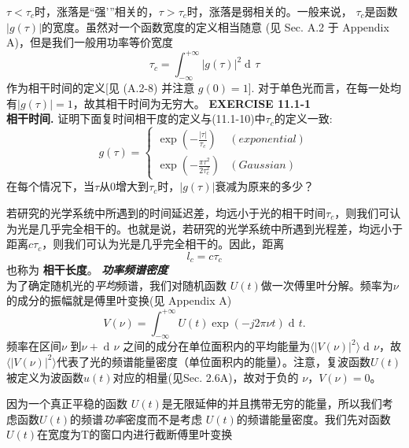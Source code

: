 \documentclass[UTF8]{ctexart}
\newcommand\crule[3][black]{\textcolor{#1}{\rule{#2}{#3}}}
\numberwithin{figure}{subsection}
\numberwithin{table}{subsection}
\DeclareMathOperator\dif{d\!}
\begin{document}
\par  $\tau < \tau_c $时，涨落是“强'”相关的，$ \tau > \tau_c $时，涨落是弱相关的。一般来说， $ \tau_c $是函数$\lvert g(\tau) \rvert $的宽度。虽然对一个函数宽度的定义相当随意 (见 Sec. A.2 于 Appendix A)，但是我们一般用功率等价宽度
\begin{equation}
\tau_c = \int_{-\infty}^{+\infty} \lvert g(\tau) \rvert ^2 \dif \tau
\end{equation}
作为相干时间的定义[见 (A.2-8) 并注意 $ g(0) = 1$]. 对于单色光而言，在每一处均有$\lvert g(\tau) \rvert = 1$，故其相干时间为无穷大。
\bigbreak\noindent{\crule[ksc]{\textwidth}{0.2cm}}
\textbf{EXERCISE 11.1-1} \\
\textbf{相干时间.} 证明下面复时间相干度的定义与(11.1-10)中$ \tau_c $的定义一致:
\begin{equation}
g(\tau) = 
\begin{cases}
\exp(-\frac{\lvert \tau \rvert}{\tau_c}) & (exponential) \\
\exp(-\frac{\pi \tau^2}{2\tau_c^2}) & (Gaussian)
\end{cases}
\end{equation}
在每个情况下，当$ \tau $从0增大到$ \tau_c $时，$ \lvert g(\tau) \rvert $衰减为原来的多少？\\
\noindent{\crule[ksc]{\textwidth}{0.2cm}}
\par 若研究的光学系统中所遇到的时间延迟差，均远小于光的相干时间$ \tau_c $，则我们可认为光是几乎完全相干的。也就是说，若研究的光学系统中所遇到光程差，均远小于距离$c\tau_c$，则我们可认为光是几乎完全相干的。因此，距离
\begin{equation}
l_c = c\tau_c
\end{equation}
也称为 \textbf{相干长度}。
\bigbreak\noindent\textcolor{ksc}{\textbf{\textsl{功率频谱密度}}}\\
为了确定随机光的\textsl{平均}频谱，我们对随机函数 $ U(t) $做一次傅里叶分解。频率为$ \nu $的成分的振幅就是傅里叶变换(见 Appendix A)
\begin{equation}
V(\nu) = \int_{-\infty}^{+\infty} U(t) \exp(-j2 \pi \nu t) \dif t .
\end{equation}
频率在区间$ \nu $ 到$ \nu +\dif \nu $ 之间的成分在单位面积内的平均能量为$ \langle \lvert V(\nu) \rvert ^2 \rangle \dif \nu $，故 $ \langle \lvert V(\nu) \rvert ^2 \rangle $代表了光的频谱能量密度（单位面积内的能量）。注意，复波函数$ U(t) $被定义为波函数$u(t)$对应的相量(见Sec. 2.6A)，故对于负的 $ \nu $，$ V(\nu) = 0 $。
\par 因为一个真正平稳的函数 $ U(t) $是无限延伸的并且携带无穷的能量，所以我们考虑函数$ U(t) $的频谱\textsl{功率}密度而不是考虑 $ U(t) $的频谱能量密度。我们先对函数$ U(t) $在宽度为T的窗口内进行截断傅里叶变换
\end{document}

